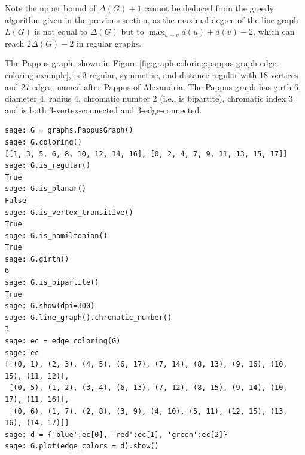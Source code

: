 Note the upper bound of $\Delta(G)+1$ 
cannot be deduced from the greedy algorithm given in the 
previous section, as the maximal degree of the line graph
$L(G)$ is not equal to 
$\Delta(G)$ but to $\displaystyle \max_{u\sim v}d(u)+d(v)-2$, which 
can reach $2\Delta(G)-2$ in regular graphs.


\begin{example}
\label{example:graph-coloring:pappas-graph-edge-coloring-example}
The Pappus graph, shown in Figure
\ref{fig:graph-coloring:pappas-graph-edge-coloring-example},
 is $3$-regular, symmetric, and distance-regular with 18 vertices and
27 edges, named after Pappus of Alexandria.
The Pappus graph has girth 6, diameter 4, radius 4, chromatic number
2 (i.e., is bipartite), 
chromatic index 3 and is both 3-vertex-connected and 3-edge-connected.

\begin{lstlisting}
sage: G = graphs.PappusGraph()
sage: G.coloring()
[[1, 3, 5, 6, 8, 10, 12, 14, 16], [0, 2, 4, 7, 9, 11, 13, 15, 17]]
sage: G.is_regular()
True
sage: G.is_planar()
False
sage: G.is_vertex_transitive()
True
sage: G.is_hamiltonian()
True
sage: G.girth()
6
sage: G.is_bipartite()
True
sage: G.show(dpi=300)
sage: G.line_graph().chromatic_number()
3
sage: ec = edge_coloring(G)
sage: ec
[[(0, 1), (2, 3), (4, 5), (6, 17), (7, 14), (8, 13), (9, 16), (10, 15), (11, 12)], 
 [(0, 5), (1, 2), (3, 4), (6, 13), (7, 12), (8, 15), (9, 14), (10, 17), (11, 16)], 
 [(0, 6), (1, 7), (2, 8), (3, 9), (4, 10), (5, 11), (12, 15), (13, 16), (14, 17)]]
sage: d = {'blue':ec[0], 'red':ec[1], 'green':ec[2]}
sage: G.plot(edge_colors = d).show()
\end{lstlisting}


\end{example}
